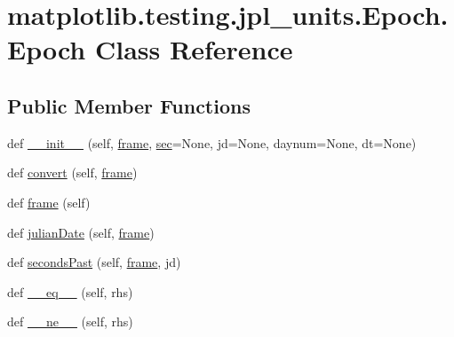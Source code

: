 \hypertarget{classmatplotlib_1_1testing_1_1jpl__units_1_1Epoch_1_1Epoch}{}\section{matplotlib.\+testing.\+jpl\+\_\+units.\+Epoch.\+Epoch Class Reference}
\label{classmatplotlib_1_1testing_1_1jpl__units_1_1Epoch_1_1Epoch}
\subsection*{Public Member Functions}
\begin{DoxyCompactItemize}
\item 
def \hyperlink{classmatplotlib_1_1testing_1_1jpl__units_1_1Epoch_1_1Epoch_ad9f3b16f399f3901ae191d03cdd8d5e9}{\+\_\+\+\_\+init\+\_\+\+\_\+} (self, \hyperlink{classmatplotlib_1_1testing_1_1jpl__units_1_1Epoch_1_1Epoch_ac62742192c43096760576a5179b46ea6}{frame}, \hyperlink{namespacematplotlib_1_1testing_1_1jpl__units_a9acc2ff11405303ec4ba044cee15b4b8}{sec}=None, jd=None, daynum=None, dt=None)
\item 
def \hyperlink{classmatplotlib_1_1testing_1_1jpl__units_1_1Epoch_1_1Epoch_a6a825a08a00b027f690c269156536fea}{convert} (self, \hyperlink{classmatplotlib_1_1testing_1_1jpl__units_1_1Epoch_1_1Epoch_ac62742192c43096760576a5179b46ea6}{frame})
\item 
def \hyperlink{classmatplotlib_1_1testing_1_1jpl__units_1_1Epoch_1_1Epoch_ac62742192c43096760576a5179b46ea6}{frame} (self)
\item 
def \hyperlink{classmatplotlib_1_1testing_1_1jpl__units_1_1Epoch_1_1Epoch_ad7aa744952aeebe4890ab9b070430b04}{julian\+Date} (self, \hyperlink{classmatplotlib_1_1testing_1_1jpl__units_1_1Epoch_1_1Epoch_ac62742192c43096760576a5179b46ea6}{frame})
\item 
def \hyperlink{classmatplotlib_1_1testing_1_1jpl__units_1_1Epoch_1_1Epoch_a23a8ba29cb0162aad9c7b019cc66fa7d}{seconds\+Past} (self, \hyperlink{classmatplotlib_1_1testing_1_1jpl__units_1_1Epoch_1_1Epoch_ac62742192c43096760576a5179b46ea6}{frame}, jd)
\item 
def \hyperlink{classmatplotlib_1_1testing_1_1jpl__units_1_1Epoch_1_1Epoch_a5b549b9c40a145c8f898d0a6b8c9c5eb}{\+\_\+\+\_\+eq\+\_\+\+\_\+} (self, rhs)
\item 
def \hyperlink{classmatplotlib_1_1testing_1_1jpl__units_1_1Epoch_1_1Epoch_a20e1e7e5f2fddd6b20e97eafaa96fbb3}{\+\_\+\+\_\+ne\+\_\+\+\_\+} (self, rhs)

\end{DoxyCompactItemize}

